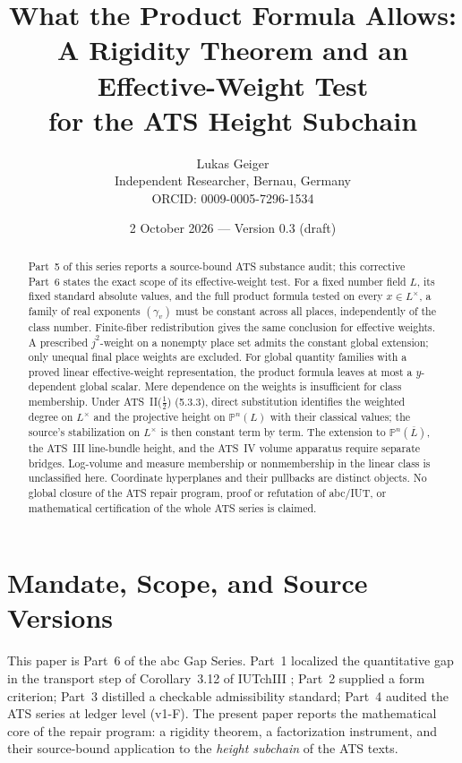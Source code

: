 \documentclass[11pt,a4paper]{article}
\title{What the Product Formula Allows:\\A Rigidity Theorem and an Effective-Weight Test\\for the ATS Height Subchain}
\author{Lukas Geiger\\\small Independent Researcher, Bernau, Germany\\\small ORCID: 0009-0005-7296-1534}
\date{2 October 2026 --- Version 0.3 (draft)}
\theoremstyle{definition}
\theoremstyle{remark}
\begin{document}
\maketitle

\begin{abstract}
Part~5 of this series \cite{part5} reports a source-bound ATS substance audit;
this corrective Part~6 states the exact scope of its effective-weight test.
For a fixed number field $L$, its fixed standard absolute values, and the
full product formula tested on every $x\in L^\times$, a family of real
exponents $(\gamma_v)$ must be constant across all places, independently of
the class number. Finite-fiber redistribution gives the same conclusion for
effective weights. A prescribed $j^2$-weight on a nonempty place set admits
the constant global extension; only unequal final place weights are excluded.
For global quantity families with a proved linear effective-weight
representation, the product formula leaves at most a $y$-dependent global
scalar. Mere dependence on the weights is insufficient for class membership.
Under ATS~II($\tfrac12$) (5.3.3), direct substitution identifies the weighted
degree on $L^\times$ and the projective height on $\mathbb P^n(L)$ with their
classical values; the source's stabilization on $L^\times$ is then constant
term by term. The extension to $\mathbb P^n(\overline L)$, the ATS~III
line-bundle height, and the ATS~IV volume apparatus require separate bridges.
Log-volume and measure membership or nonmembership in the linear class is
unclassified here. Coordinate hyperplanes and their pullbacks are distinct
objects. No global closure of the ATS repair program, proof or refutation of
abc/IUT, or mathematical certification of the whole ATS series is claimed.
\end{abstract}

\clearpage
\tableofcontents
\clearpage

\section{Mandate, Scope, and Source Versions}\label{sec:mandate}

This paper is Part~6 of the abc Gap Series. Part~1 \cite{part1} localized the
quantitative gap in the transport step of Corollary~3.12 of IUTchIII
\cite{mochizukiIUT}; Part~2 \cite{part2} supplied a form criterion;
Part~3 \cite{part3} distilled a checkable admissibility
standard; Part~4 \cite{part4} audited the ATS series
\cite{joshiI,joshiII,joshiIIhalf,joshiIII,joshiIV} at ledger level (v1-F). The
present paper reports the mathematical core of the repair program: a
rigidity theorem, a factorization instrument, and their source-bound
application to the \emph{height subchain} of the ATS texts.
\end{document}
